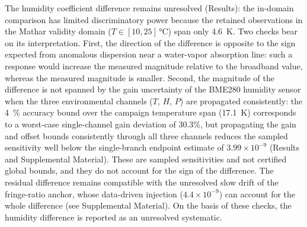 \documentclass[aps,prapplied,reprint,groupedaddress,twocolumn,superscriptaddress,linenumbers]{revtex4-2}
\begin{document}
The humidity coefficient difference remains unresolved (Results): the in-domain comparison has limited discriminatory power because the retained observations in the Mathar validity domain ($T \in [10,25]\,\si{\degreeCelsius}$) span only \SI{4.6}{\kelvin}. Two checks bear on its interpretation. First, the direction of the difference is opposite to the sign expected from anomalous dispersion near a water-vapor absorption line: such a response would increase the measured magnitude relative to the broadband value, whereas the measured magnitude is smaller. Second, the magnitude of the difference is not spanned by the gain uncertainty of the BME280 humidity sensor when the three environmental channels ($T$, $H$, $P$) are propagated consistently: the \SI{4}{\percent} accuracy bound over the campaign temperature span (\SI{17.1}{\kelvin}) corresponds to a worst-case single-channel gain deviation of 30.3\%, but propagating the gain and offset bounds consistently through all three channels reduces the sampled sensitivity well below the single-branch endpoint estimate of $3.99 \times 10^{-9}$ (Results and Supplemental Material). These are sampled sensitivities and not certified global bounds, and they do not account for the sign of the difference. The residual difference remains compatible with the unresolved slow drift of the fringe-ratio anchor, whose data-driven injection ($4.4 \times 10^{-9}$) can account for the whole difference (see Supplemental Material). On the basis of these checks, the humidity difference is reported as an unresolved systematic.
\end{document}
